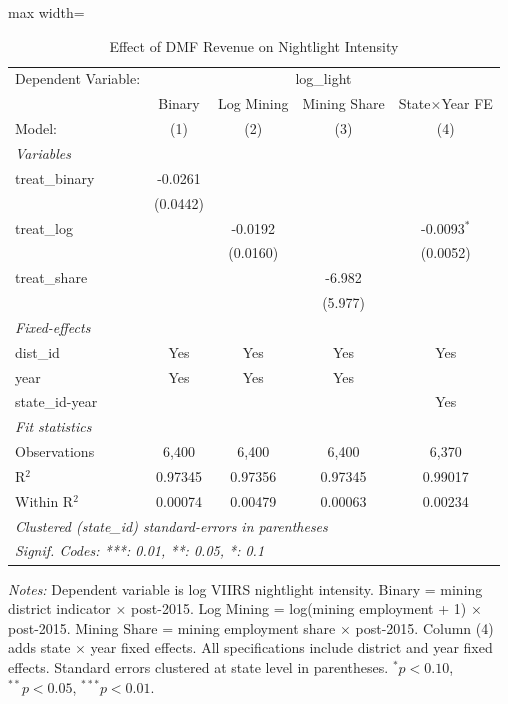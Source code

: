 \begin{table}[htbp]
   \caption{\label{tab:main} Effect of DMF Revenue on Nightlight Intensity}
   \centering
   \begin{adjustbox}{max width=\textwidth}
\begin{tabular}{lcccc}
      \tabularnewline \midrule \midrule
      Dependent Variable: & \multicolumn{4}{c}{log\_light}\\
                      & Binary   & Log Mining & Mining Share & State$\times$Year FE \\    
      Model:          & (1)      & (2)        & (3)          & (4)\\  
      \midrule
      \emph{Variables}\\
      treat\_binary   & -0.0261  &            &              &   \\   
                      & (0.0442) &            &              &   \\   
      treat\_log      &          & -0.0192    &              & -0.0093$^{*}$\\   
                      &          & (0.0160)   &              & (0.0052)\\   
      treat\_share    &          &            & -6.982       &   \\   
                      &          &            & (5.977)      &   \\   
      \midrule
      \emph{Fixed-effects}\\
      dist\_id        & Yes      & Yes        & Yes          & Yes\\  
      year            & Yes      & Yes        & Yes          & \\  
      state\_id-year  &          &            &              & Yes\\  
      \midrule
      \emph{Fit statistics}\\
      Observations    & 6,400    & 6,400      & 6,400        & 6,370\\  
      R$^2$           & 0.97345  & 0.97356    & 0.97345      & 0.99017\\  
      Within R$^2$    & 0.00074  & 0.00479    & 0.00063      & 0.00234\\  
      \midrule \midrule
      \multicolumn{5}{l}{\emph{Clustered (state\_id) standard-errors in parentheses}}\\
      \multicolumn{5}{l}{\emph{Signif. Codes: ***: 0.01, **: 0.05, *: 0.1}}\\
   \end{tabular}
\end{adjustbox}
   
   \par \raggedright 
   \textit{Notes:} Dependent variable is log VIIRS nightlight intensity. Binary = mining district indicator $\times$ post-2015. Log Mining = log(mining employment + 1) $\times$ post-2015. Mining Share = mining employment share $\times$ post-2015. Column (4) adds state $\times$ year fixed effects. All specifications include district and year fixed effects. Standard errors clustered at state level in parentheses. $^{*}p<0.10$, $^{**}p<0.05$, $^{***}p<0.01$.
\end{table}
